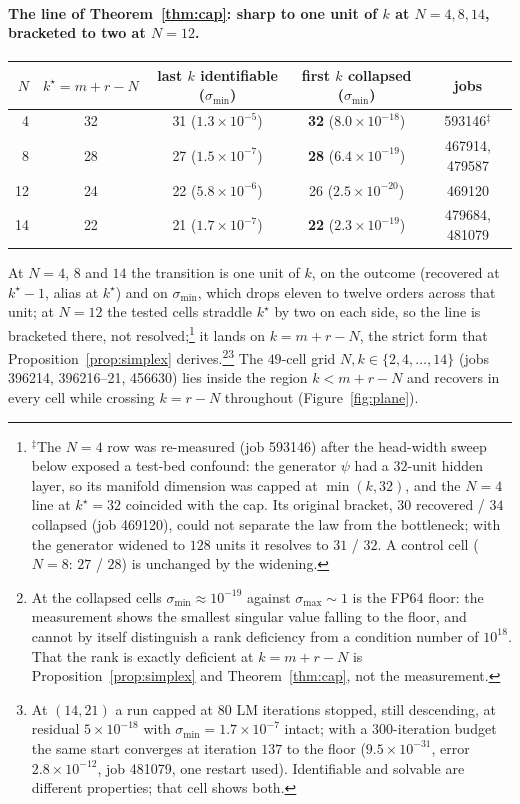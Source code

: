 \paragraph{The line of Theorem~\ref{thm:cap}: sharp to one unit of $k$ at
$N=4,8,14$, bracketed to two at $N=12$.}
\begin{center}\small
\begin{tabular}{@{}rcccc@{}}\toprule
$N$ & $k^\star=m+r-N$ & last $k$ identifiable ($\sigma_{\min}$) & first $k$ collapsed ($\sigma_{\min}$) & jobs\\ \midrule
4  & 32 & 31 ($1.3\times10^{-5}$) & \textbf{32} ($8.0\times10^{-18}$) & 593146$^{\ddagger}$\\
8  & 28 & 27 ($1.5\times10^{-7}$) & \textbf{28} ($6.4\times10^{-19}$) & 467914, 479587\\
12 & 24 & 22 ($5.8\times10^{-6}$) & 26 ($2.5\times10^{-20}$) & 469120\\
14 & 22 & 21 ($1.7\times10^{-7}$) & \textbf{22} ($2.3\times10^{-19}$) & 479684, 481079\\ \bottomrule
\end{tabular}
\end{center}
At $N=4$, $8$ and $14$ the transition is one unit of $k$, on the outcome
(recovered at $k^\star-1$, alias at $k^\star$) and on $\sigma_{\min}$, which
drops eleven to twelve orders across that unit; at $N=12$ the tested cells
straddle $k^\star$ by two on each side, so the line is bracketed there, not
resolved;\footnote{$^\ddagger$The $N=4$ row was re-measured (job 593146)
after the head-width sweep below exposed a test-bed confound: the generator
$\psi$ had a $32$-unit hidden layer, so its manifold dimension was capped at
$\min(k,32)$, and the $N=4$ line at $k^\star=32$ coincided with the cap. Its
original bracket, $30$ recovered / $34$ collapsed (job 469120), could not
separate the law from the bottleneck; with the generator widened to $128$
units it resolves to $31$ / $32$. A control cell ($N=8$: $27$ / $28$) is
unchanged by the widening.} it lands on $k=m+r-N$, the strict form
that Proposition~\ref{prop:simplex} derives.\footnote{At the collapsed cells
$\sigma_{\min}\approx10^{-19}$ against $\sigma_{\max}\sim1$ is the FP64
floor: the measurement shows the smallest singular value falling to the
floor, and cannot by itself distinguish a rank deficiency from a condition
number of $10^{18}$. That the rank is exactly deficient at $k=m+r-N$ is
Proposition~\ref{prop:simplex} and Theorem~\ref{thm:cap}, not the
measurement.}\footnote{At $(14,21)$ a run
capped at $80$ LM iterations stopped, still descending, at residual
$5\times10^{-18}$ with $\sigma_{\min}=1.7\times10^{-7}$ intact; with a
$300$-iteration budget the same start converges at iteration $137$ to the
floor ($9.5\times10^{-31}$, error $2.8\times10^{-12}$, job 481079, one
restart used). Identifiable and solvable are different properties; that cell
shows both.} The $49$-cell
grid $N,k\in\{2,4,\dots,14\}$ (jobs 396214, 396216--21, 456630) lies inside the region
$k<m+r-N$ and recovers in every cell while crossing $k=r-N$ throughout
(Figure~\ref{fig:plane}).

